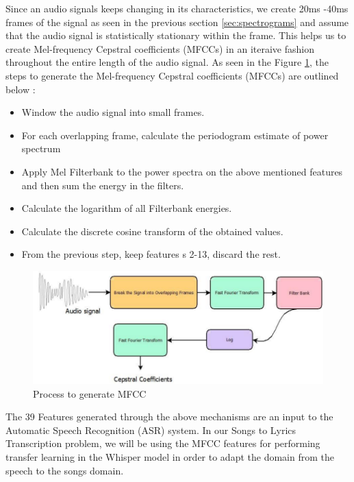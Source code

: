 Since an audio signals keeps changing in its characteristics, we create 20ms -40ms frames of the signal as seen in the previous section \ref{sec:spectrograms} and assume that the audio signal is statistically stationary within the frame. This helps us to create Mel-frequency Cepstral coefficients (MFCCs) in an iteraive fashion throughout the entire length of the audio signal. As seen in the Figure \ref{fig:mfccgeneration}, the steps to generate the Mel-frequency Cepstral coefficients (MFCCs)  are outlined below \cite{huang2001spoken} \cite{song2016detecting}:
\begin{itemize}
    \item Window the audio signal into small frames.
    \item For each overlapping frame, calculate the periodogram estimate of power spectrum \cite{song2016detecting}
    \item Apply Mel Filterbank to the power spectra on the above mentioned features and then sum the energy in the filters.
    \item Calculate the logarithm of all Filterbank energies.
    \item Calculate the discrete cosine transform of the obtained values.
    \item From the previous step, keep features s 2-13, discard the rest.
\end{itemize}


\begin{figure}
    \centering
    \includegraphics[width=1.0\textwidth]{03-Theoretical Foundations/figures/mfcc_generation.pdf}
    \caption{Process to generate MFCC}
    \label{fig:mfccgeneration}
\end{figure}


The 39 Features generated through the above mechanisms are an input to the Automatic Speech Recognition (ASR) system. In our Songs to Lyrics Transcription problem, we will be using the MFCC features for performing transfer learning in the Whisper model in order to adapt the domain from the speech to the songs domain.


